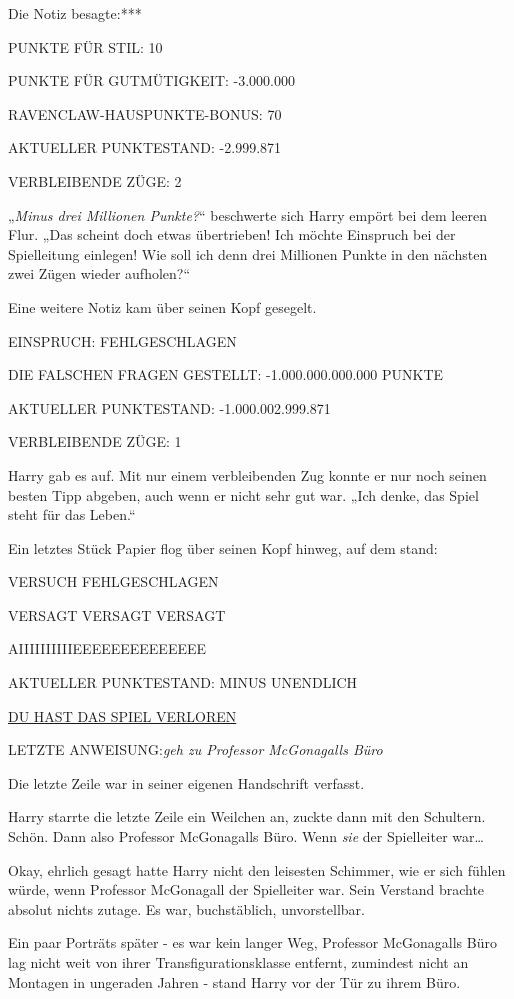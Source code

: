 {Die Notiz besagte:***

PUNKTE FÜR STIL: 10

PUNKTE FÜR GUTMÜTIGKEIT: -3.000.000

RAVENCLAW-HAUSPUNKTE-BONUS: 70

AKTUELLER PUNKTESTAND: -2.999.871

VERBLEIBENDE ZÜGE: 2

„\emph{Minus drei Millionen Punkte?}“ beschwerte sich Harry empört bei dem leeren Flur. „Das scheint doch etwas übertrieben! Ich möchte Einspruch bei der Spielleitung einlegen! Wie soll ich denn drei Millionen Punkte in den nächsten zwei Zügen wieder aufholen?“

Eine weitere Notiz kam über seinen Kopf gesegelt.

EINSPRUCH: FEHLGESCHLAGEN

DIE FALSCHEN FRAGEN GESTELLT: -1.000.000.000.000 PUNKTE

AKTUELLER PUNKTESTAND: -1.000.002.999.871

VERBLEIBENDE ZÜGE: 1

Harry gab es auf. Mit nur einem verbleibenden Zug konnte er nur noch seinen besten Tipp abgeben, auch wenn er nicht sehr gut war. „Ich denke, das Spiel steht für das Leben.“

Ein letztes Stück Papier flog über seinen Kopf hinweg, auf dem stand:

VERSUCH FEHLGESCHLAGEN

VERSAGT VERSAGT VERSAGT

AIIIIIIIIIIEEEEEEEEEEEEEE

AKTUELLER PUNKTESTAND: MINUS UNENDLICH

\uline{DU HAST DAS SPIEL VERLOREN}

LETZTE ANWEISUNG:\emph{\hfill\break geh zu Professor McGonagalls Büro}

Die letzte Zeile war in seiner eigenen Handschrift verfasst.

Harry starrte die letzte Zeile ein Weilchen an, zuckte dann mit den Schultern. Schön. Dann also Professor McGonagalls Büro. Wenn \emph{sie} der Spielleiter war…

Okay, ehrlich gesagt hatte Harry nicht den leisesten Schimmer, wie er sich fühlen würde, wenn Professor McGonagall der Spielleiter war. Sein Verstand brachte absolut nichts zutage. Es war, buchstäblich, unvorstellbar.

Ein paar Porträts später - es war kein langer Weg, Professor McGonagalls Büro lag nicht weit von ihrer Transfigurationsklasse entfernt, zumindest nicht an Montagen in ungeraden Jahren - stand Harry vor der Tür zu ihrem Büro.

}
